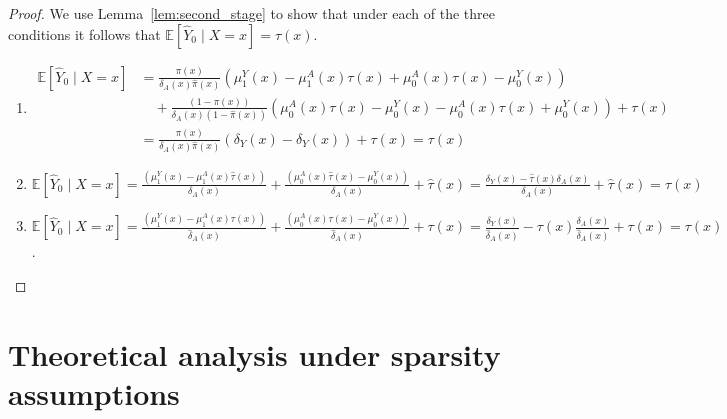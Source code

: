 \documentclass[nonatbib]{article}
\newcommand{\E}{\mathbb{E}}
\theoremstyle{definition}
\theoremstyle{plain}
\begin{document}
\begin{proof}
We use Lemma~\ref{lem:second_stage} to show that under each of the three conditions it follows that  $\E[\hat{Y}_0 \mid X=x] = \tau(x)$.
\begin{enumerate}
    \item \begin{align}
    \E[\hat{Y}_0 \mid X=x] &=  \frac{\pi(x)}{\delta_A(x) \hat{\pi}(x)} \left(\mu_1^Y(x) - \mu_1^A(x)\tau(x) + \mu_0^A(x) \tau(x) - \mu_0^Y (x)\right) \\
   & \quad + \frac{(1-\pi(x))}{\delta_A(x)(1 - \hat{\pi}(x))} \left(\mu_0^A(x) \tau(x) -\mu_0^Y(x)  - \mu_0^A(x) \tau(x) + \mu_0^Y (x)\right)
    + \tau(x) \\
    &= \frac{\pi(x)}{\delta_A(x) \hat{\pi}(x)} \left(\delta_Y(x) - \delta_Y(x) \right) + \tau(x) = \tau(x)
    \end{align}
    
    \item $\E[\hat{Y}_0 \mid X=x] = \frac{\left(\mu_1^Y(x) - \mu_1^A(x) \hat{\tau}(x)\right)}{\delta_A(x)}
   + \frac{\left(\mu_0^A(x) \hat{\tau}(x) -\mu_0^Y(x) \right)}{\delta_A(x)} + \hat{\tau}(x) = \frac{\delta_Y(x) - \hat{\tau}(x) \delta_A(x)}{\delta_A(x)} + \hat{\tau}(x) = \tau(x)$
  
     \item $\E[\hat{Y}_0 \mid X=x] = \frac{\left(\mu_1^Y(x) - \mu_1^A(x) \tau(x)\right)}{\hat{\delta}_A(x)}
   + \frac{\left(\mu_0^A(x) \tau(x) -\mu_0^Y(x) \right)}{\hat{\delta}_A(x)} + \tau(x) = \frac{\delta_Y(x)}{\hat{\delta}_A(x)} - \tau(x) \frac{\delta_A(x)}{\hat{\delta}_A(x)} + \tau(x) = \tau(x)$.
\end{enumerate}
\end{proof}

\clearpage
\section{Theoretical analysis under sparsity assumptions}\label{app:sparsity}

\clearpage
\end{document}
